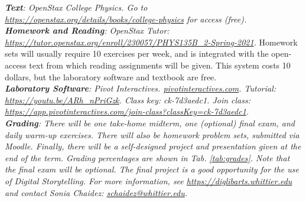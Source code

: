\documentclass[10pt]{article}
\begin{document}
\textit{\textbf{Text}: OpenStax \textit{College Physics}. Go to \url{https://openstax.org/details/books/college-physics} for access (free).} \\
\textit{\textbf{Homework and Reading}: OpenStax Tutor: \url{https://tutor.openstax.org/enroll/230057/PHYS135B_2-Spring-2021}.} Homework sets will usually require 10 exercises per week, and is integrated with the open-access text from which reading assignments will be given. This system costs 10 dollars, but the laboratory software and textbook are free. \\
\textit{\textbf{Laboratory Software}: Pivot Interactives. \url{pivotinteractives.com}.  Tutorial: \url{https://youtu.be/ARh_nPriGzk}.  Class key: ck-7d3aedc1.  Join class: \url{https://app.pivotinteractives.com/join-class?classKey=ck-7d3aedc1}.} \\
\textit{\textbf{Grading}: There will be one take-home midterm, one (optional) final exam, and daily warm-up exercises.  There will also be homework problem sets, submitted via Moodle.  Finally, there will be a self-designed project and presentation given at the end of the term.  Grading percentages are shown in Tab. \ref{tab:grades}.  \textit{Note that the final exam will be optional.} The final project is a good opportunity for the use of Digital Storytelling.  For more information, see \url{https://diglibarts.whittier.edu} and contact Sonia Chaidez: \url{schaidez@whittier.edu}. } \\
\end{document}
